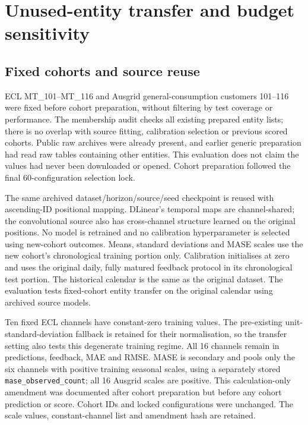 \documentclass[11pt,a4paper]{article}
\begin{document}
\section{Unused-entity transfer and budget sensitivity}
\subsection{Fixed cohorts and source reuse}
ECL MT\_101--MT\_116 and Ausgrid general-consumption customers 101--116 were fixed before cohort preparation, without filtering by test coverage or performance. The membership audit checks all existing prepared entity lists; there is no overlap with source fitting, calibration selection or previous scored cohorts. Public raw archives were already present, and earlier generic preparation had read raw tables containing other entities. This evaluation does not claim the values had never been downloaded or opened. Cohort preparation followed the final 60-configuration selection lock.

The same archived dataset/horizon/source/seed checkpoint is reused with ascending-ID positional mapping. DLinear's temporal maps are channel-shared; the convolutional source also has cross-channel structure learned on the original positions. No model is retrained and no calibration hyperparameter is selected using new-cohort outcomes. Means, standard deviations and MASE scales use the new cohort's chronological training portion only. Calibration initialises at zero and uses the original daily, fully matured feedback protocol in its chronological test portion. The historical calendar is the same as the original dataset. The evaluation tests fixed-cohort entity transfer on the original calendar using archived source models.

\begin{table}[htbp]
\centering\small
\caption{Absolute MAE for all eight unused-entity settings, with five archived source seeds. Units are kW for ECL and kWh per hourly interval for Ausgrid.}

\end{table}
\FloatBarrier
{\footnotesize}
{\footnotesize}
{\footnotesize}

Ten fixed ECL channels have constant-zero training values. The pre-existing unit-standard-deviation fallback is retained for their normalisation, so the transfer setting also tests this degenerate training regime. All 16 channels remain in predictions, feedback, MAE and RMSE. MASE is secondary and pools only the six channels with positive training seasonal scales, using a separately stored \texttt{mase\_observed\_count}; all 16 Ausgrid scales are positive. This calculation-only amendment was documented after cohort preparation but before any cohort prediction or score. Cohort IDs and locked configurations were unchanged. The scale values, constant-channel list and amendment hash are retained.
\end{document}
